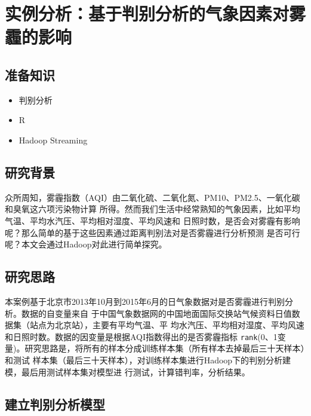 \section{实例分析：基于判别分析的气象因素对雾霾的影响}\label{ux5b9eux4f8bux5206ux6790ux57faux4e8eux5224ux522bux5206ux6790ux7684ux6c14ux8c61ux56e0ux7d20ux5bf9ux96feux973eux7684ux5f71ux54cd}

\subsection{准备知识}\label{ux51c6ux5907ux77e5ux8bc6}

\begin{itemize}
\itemsep1pt\parskip0pt
\item
  判别分析
\item
  R
\item
  Hadoop Streaming
\end{itemize}

\subsection{研究背景}\label{ux7814ux7a76ux80ccux666f}

众所周知，雾霾指数（AQI）由二氧化硫、二氧化氮、PM10、PM2.5、一氧化碳和臭氧这六项污染物计算
所得。然而我们生活中经常熟知的气象因素，比如平均气温、平均水汽压、平均相对湿度、平均风速和
日照时数，是否会对雾霾有影响呢？那么简单的基于这些因素通过距离判别法对是否雾霾进行分析预测
是否可行呢？本文会通过Hadoop对此进行简单探究。

\subsection{研究思路}\label{ux7814ux7a76ux601dux8def}

本案例基于北京市2013年10月到2015年6月的日气象数据对是否雾霾进行判别分析。数据的自变量来自
于中国气象数据网的中国地面国际交换站气候资料日值数据集（站点为北京站），主要有平均气温、平
均水汽压、平均相对湿度、平均风速和日照时数。数据的因变量是根据AQI指数得出的是否雾霾指标
\lstinline|rank|(0、1变量)。研究思路是，将所有的样本分成训练样本集（所有样本去掉最后三十天样本）和测试
样本集（最后三十天样本），对训练样本集进行Hadoop下的判别分析建模，最后用测试样本集对模型进
行测试，计算错判率，分析结果。

\subsection{建立判别分析模型}\label{ux5efaux7acbux5224ux522bux5206ux6790ux6a21ux578b}


